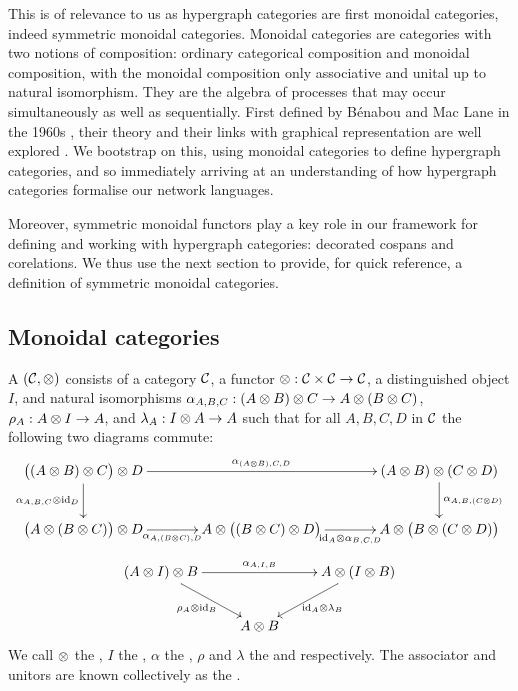 This is of relevance to us as hypergraph categories are first monoidal
categories, indeed symmetric monoidal categories.  Monoidal categories are
categories with two notions of composition: ordinary categorical composition and
monoidal composition, with the monoidal composition only associative and unital
up to natural isomorphism. They are the algebra of processes that may occur
simultaneously as well as sequentially.  First defined by B\'enabou and Mac Lane
in the 1960s \cite{Ben63, Mac63}, their theory and their links with graphical
representation are well explored \cite{JS91, Sel11}. We bootstrap on this, using
monoidal categories to define hypergraph categories, and so immediately arriving
at an understanding of how hypergraph categories formalise our network
languages. 

Moreover, symmetric monoidal functors play a key role in our framework for
defining and working with hypergraph categories: decorated cospans and
corelations. We thus use the next section to provide, for quick reference, a
definition of symmetric monoidal categories.


\subsection{Monoidal categories}
A  $({\mathcal{C}}, \otimes)$ consists of a category ${\mathcal{C}}$, a
functor $\otimes: {\mathcal{C}} \times {\mathcal{C}} \to {\mathcal{C}}$, a distinguished object $I$, and natural
isomorphisms $\alpha_{A,B,C}: (A \otimes B) \otimes C \to A \otimes (B \otimes C)$,
$\rho_A: A \otimes I  \to A$, and $\lambda_A: I \otimes A \to A$ such that for all
$A,B,C,D$ in $\mathcal C$ the following two diagrams commute: 
\[
  \xymatrixcolsep{3pc}
  \xymatrix{
    \big((A \ot B) \ot C\big) \ot D \ar[d]_{\a_{A,B,C}\ot\idn_D} \ar[rr]^{\a_{(A\ot B),C,D}} 
    &&(A \ot B) \ot (C \ot D) \ar[d]^{\a_{A,B,(C\ot D)}} \\
    \big(A \ot (B\ot C)\big) \ot D \ar[r]_{\a_{A,(B\ot C),D}} 
    & A\ot\big((B \ot C)\ot D\big)\ar[r]_{\idn_A \ot \a_{B,C,D}}
    &A \ot \big(B \ot (C \ot D)\big)
  }
\]
\[
  \xymatrix{
    (A\ot I)\ot B  \ar[rr]^{\a_{A,I,B}} \ar[dr]_{\rho_{A}\ot \idn_B} && A \ot (I \ot B) \ar[dl]^{\idn_A\ot \lambda_B}\\
    & A \ot B \\
  }
\]
We call $\otimes$ the , $I$ the ,
$\alpha$ the , $\rho$ and $\lambda$ the  and
 respectively. The associator and unitors are known
collectively as the .

